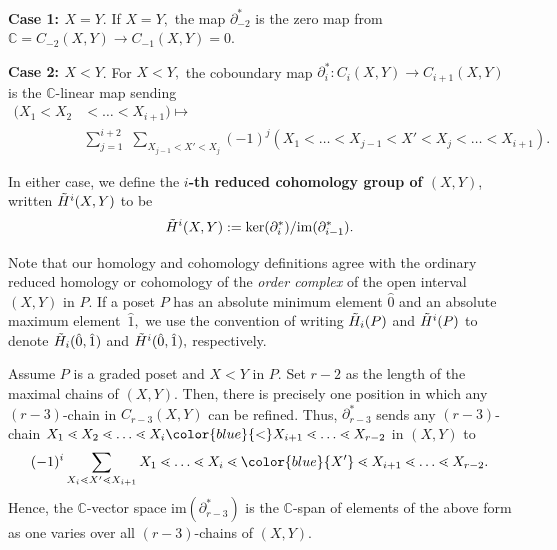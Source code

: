 \documentclass[ALCO, Unicode]{cedram}
\def \ker{\mathrm{ker}}
\def \im{\mathrm{im}}
\def\C{{\mathbb{C}}}
\begin{document}
{ \sf\bf{Case 1: $X = Y$}}. If $X = Y,$ the map \textbf{$\partial_{-2}^\ast$} is the zero map from $\C =  C_{-2}(X, Y)  \to C_{-1}(X, Y) = 0.$ 

{ \sf\bf{Case 2: $X < Y$}}. For $X < Y,$ the  coboundary map \textbf{$\partial_i^\ast: C_i(X, Y) \longrightarrow C_{i + 1}(X, Y)$} is the $\C$-linear map sending
\begin{align*}
    (X_1 < X_2 &< \ldots < X_{i + 1}) \longmapsto\\ &\sum_{j = 1}^{i + 2} \,\, \sum_{X_{j - 1} < X' < X_j}(-1)^j (X_1 < \ldots < X_{j - 1} < X' < X_j  < \ldots <  X_{i + 1}).
\end{align*}


In either case, we define the \textbf{$i$-th reduced cohomology group of $(X, Y)$}, written \textbf{$\Tilde{H}^i(X, Y)$} to be \[\Tilde{H}^i(X, Y): = \ker(\partial_i^\ast) / \im(\partial_{i - 1}^\ast).\]

Note that our homology and cohomology definitions agree with the ordinary reduced homology or cohomology of the \textit{order complex} of the open interval $(X, Y)$ in $P.$  If a poset $P$ has an absolute minimum element $\hat{0}$ and an absolute maximum element~$\hat{1},$ we use the convention of writing \textbf{$\Tilde{H}_i(P)$} and \textbf{$\Tilde{H}^i(P)$} to denote $\Tilde{H}_i(\hat{0}, \hat{1})$ and $\Tilde{H}^i(\hat{0}, \hat{1}),$ respectively. 

\begin{rema}\label{rem:top-cohomology}
    Assume $P$ is a graded poset and $X < Y$ in $P.$ Set $r -2$ as the length of the maximal chains of $(X, Y).$ Then, there is precisely one position in which any $(r - 3)$-chain in $C_{r - 3}(X, Y)$ can be refined. Thus, $\partial_{r - 3}^\ast$ sends any $(r - 3)$-chain $ X_1 \lessdot  X_2 \lessdot  \ldots \lessdot X_i \color{blue}{<}\normalcolor  X_{i + 1} \lessdot \ldots \lessdot   X_{r - 2}$ in $(X, Y)$ to 
    \begin{align*}
        (-1)^i \sum_{X_i \lessdot X' \lessdot X_{i + 1}}X_1 \lessdot \ldots \lessdot X_i \lessdot \color{blue}{X'} \normalcolor \lessdot X_{i + 1} \lessdot \ldots \lessdot X_{r-2}. 
    \end{align*}
    Hence, the $\C$-vector space $\im \left(\partial_{r - 3}^\ast\right)$ is the $\C$-span of elements of the above form as one varies over all $(r - 3)$-chains of $(X, Y).$
\end{rema}
\end{document}
